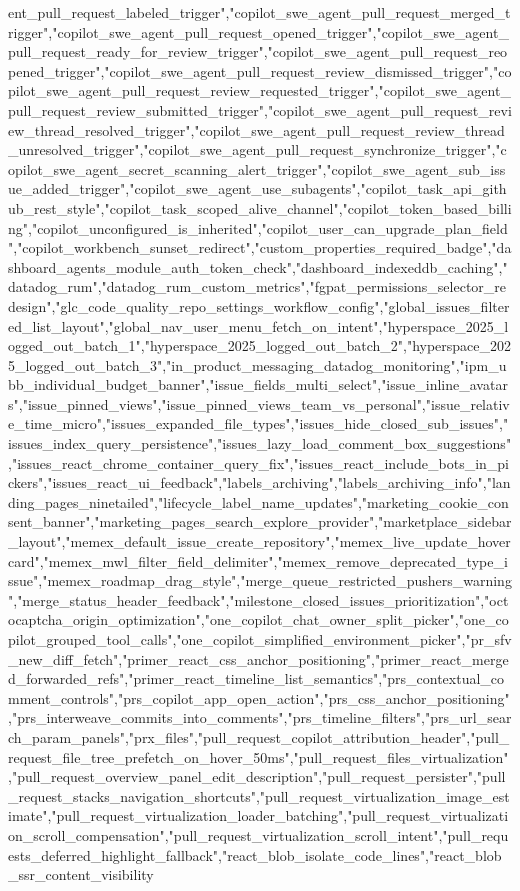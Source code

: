 {{{{{{{ent_pull_request_labeled_trigger","copilot_swe_agent_pull_request_merged_trigger","copilot_swe_agent_pull_request_opened_trigger","copilot_swe_agent_pull_request_ready_for_review_trigger","copilot_swe_agent_pull_request_reopened_trigger","copilot_swe_agent_pull_request_review_dismissed_trigger","copilot_swe_agent_pull_request_review_requested_trigger","copilot_swe_agent_pull_request_review_submitted_trigger","copilot_swe_agent_pull_request_review_thread_resolved_trigger","copilot_swe_agent_pull_request_review_thread_unresolved_trigger","copilot_swe_agent_pull_request_synchronize_trigger","copilot_swe_agent_secret_scanning_alert_trigger","copilot_swe_agent_sub_issue_added_trigger","copilot_swe_agent_use_subagents","copilot_task_api_github_rest_style","copilot_task_scoped_alive_channel","copilot_token_based_billing","copilot_unconfigured_is_inherited","copilot_user_can_upgrade_plan_field","copilot_workbench_sunset_redirect","custom_properties_required_badge","dashboard_agents_module_auth_token_check","dashboard_indexeddb_caching","datadog_rum","datadog_rum_custom_metrics","fgpat_permissions_selector_redesign","glc_code_quality_repo_settings_workflow_config","global_issues_filtered_list_layout","global_nav_user_menu_fetch_on_intent","hyperspace_2025_logged_out_batch_1","hyperspace_2025_logged_out_batch_2","hyperspace_2025_logged_out_batch_3","in_product_messaging_datadog_monitoring","ipm_ubb_individual_budget_banner","issue_fields_multi_select","issue_inline_avatars","issue_pinned_views","issue_pinned_views_team_vs_personal","issue_relative_time_micro","issues_expanded_file_types","issues_hide_closed_sub_issues","issues_index_query_persistence","issues_lazy_load_comment_box_suggestions","issues_react_chrome_container_query_fix","issues_react_include_bots_in_pickers","issues_react_ui_feedback","labels_archiving","labels_archiving_info","landing_pages_ninetailed","lifecycle_label_name_updates","marketing_cookie_consent_banner","marketing_pages_search_explore_provider","marketplace_sidebar_layout","memex_default_issue_create_repository","memex_live_update_hovercard","memex_mwl_filter_field_delimiter","memex_remove_deprecated_type_issue","memex_roadmap_drag_style","merge_queue_restricted_pushers_warning","merge_status_header_feedback","milestone_closed_issues_prioritization","octocaptcha_origin_optimization","one_copilot_chat_owner_split_picker","one_copilot_grouped_tool_calls","one_copilot_simplified_environment_picker","pr_sfv_new_diff_fetch","primer_react_css_anchor_positioning","primer_react_merged_forwarded_refs","primer_react_timeline_list_semantics","prs_contextual_comment_controls","prs_copilot_app_open_action","prs_css_anchor_positioning","prs_interweave_commits_into_comments","prs_timeline_filters","prs_url_search_param_panels","prx_files","pull_request_copilot_attribution_header","pull_request_file_tree_prefetch_on_hover_50ms","pull_request_files_virtualization","pull_request_overview_panel_edit_description","pull_request_persister","pull_request_stacks_navigation_shortcuts","pull_request_virtualization_image_estimate","pull_request_virtualization_loader_batching","pull_request_virtualization_scroll_compensation","pull_request_virtualization_scroll_intent","pull_requests_deferred_highlight_fallback","react_blob_isolate_code_lines","react_blob_ssr_content_visibility}}}}}}}
